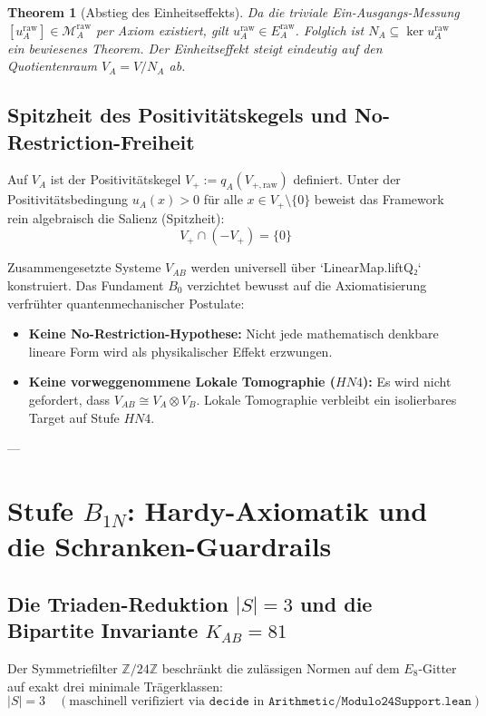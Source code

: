 \documentclass[11pt,a4paper]{article}
\newtheorem{theorem}{Theorem}[section]
\begin{document}
\begin{theorem}[Abstieg des Einheitseffekts]
Da die triviale Ein-Ausgangs-Messung $[u_A^{\text{raw}}] \in \mathcal{M}_A^{\text{raw}}$ per Axiom existiert, gilt $u_A^{\text{raw}} \in E_A^{\text{raw}}$. Folglich ist $N_A \subseteq \ker u_A^{\text{raw}}$ ein bewiesenes Theorem. Der Einheitseffekt steigt eindeutig auf den Quotientenraum $V_A = V / N_A$ ab.
\end{theorem}

\subsection{Spitzheit des Positivitätskegels und No-Restriction-Freiheit}

Auf $V_A$ ist der Positivitätskegel $V_+ := q_A(V_{+,\text{raw}})$ definiert. Unter der Positivitätsbedingung $u_A(x) > 0$ für alle $x \in V_+ \setminus \{0\}$ beweist das Framework rein algebraisch die Salienz (Spitzheit):
\begin{equation}
V_+ \cap (-V_+) = \{0\}
\end{equation}

Zusammengesetzte Systeme $V_{AB}$ werden universell über `LinearMap.liftQ₂` konstruiert. Das Fundament $B_0$ verzichtet bewusst auf die Axiomatisierung verfrühter quantenmechanischer Postulate:
\begin{itemize}
    \item \textbf{Keine No-Restriction-Hypothese:} Nicht jede mathematisch denkbare lineare Form wird als physikalischer Effekt erzwungen.
    \item \textbf{Keine vorweggenommene Lokale Tomographie ($HN4$):} Es wird nicht gefordert, dass $V_{AB} \cong V_A \otimes V_B$. Lokale Tomographie verbleibt ein isolierbares Target auf Stufe $HN4$.
\end{itemize}

---

\section{Stufe $B_{1N}$: Hardy-Axiomatik und die Schranken-Guardrails}

\subsection{Die Triaden-Reduktion $|S|=3$ und die Bipartite Invariante $K_{AB} = 81$}

Der Symmetriefilter $\mathbb{Z}/24\mathbb{Z}$ beschränkt die zulässigen Normen auf dem $E_8$-Gitter auf exakt drei minimale Trägerklassen:
\begin{equation}
|S| = 3 \quad (\text{maschinell verifiziert via } \texttt{decide} \text{ in } \texttt{Arithmetic/Modulo24Support.lean})
\end{equation}
\end{document}
